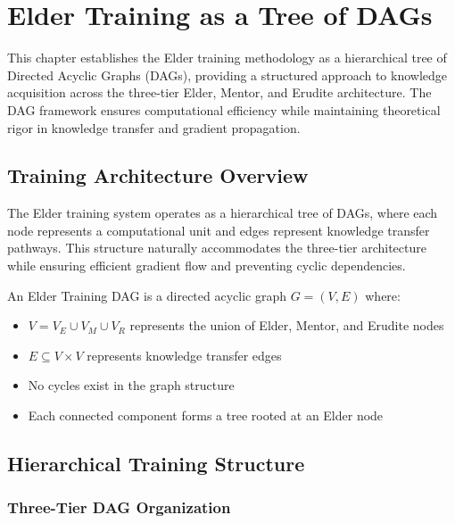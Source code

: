 \chapter{Elder Training as a Tree of DAGs}

\begin{chaptersummary}
This chapter establishes the Elder training methodology as a hierarchical tree of Directed Acyclic Graphs (DAGs), providing a structured approach to knowledge acquisition across the three-tier Elder, Mentor, and Erudite architecture. The DAG framework ensures computational efficiency while maintaining theoretical rigor in knowledge transfer and gradient propagation.
\end{chaptersummary}

\section{Training Architecture Overview}

The Elder training system operates as a hierarchical tree of DAGs, where each node represents a computational unit and edges represent knowledge transfer pathways. This structure naturally accommodates the three-tier architecture while ensuring efficient gradient flow and preventing cyclic dependencies.

\begin{definition}
An Elder Training DAG is a directed acyclic graph $G = (V, E)$ where:
\begin{itemize}
    \item $V = V_E \cup V_M \cup V_R$ represents the union of Elder, Mentor, and Erudite nodes
    \item $E \subseteq V \times V$ represents knowledge transfer edges
    \item No cycles exist in the graph structure
    \item Each connected component forms a tree rooted at an Elder node
\end{itemize}
\end{definition}

\section{Hierarchical Training Structure}

\subsection{Three-Tier DAG Organization}

